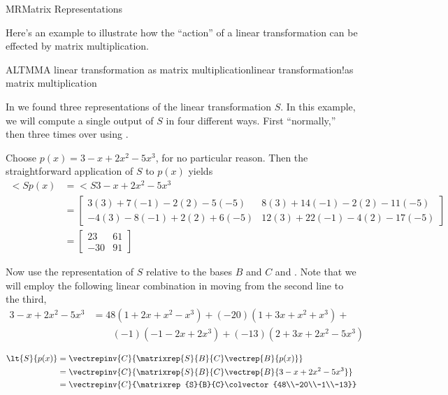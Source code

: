 \begin{subsect}{MR}{Matrix Representations}
\begin{para}
%
\end{para}
%
\begin{para}Here's an example to illustrate how the ``action'' of a linear transformation can be effected by matrix multiplication.\end{para}
%
\begin{example}{ALTMM}{A linear transformation as matrix multiplication}{linear transformation!as matrix multiplication}
\begin{para}In  we found three representations of the linear transformation $S$.  In this example, we will compute a single output of $S$ in four different ways.  First ``normally,'' then three times over using .\end{para}
%
\begin{para}Choose $p(x)=3-x+2x^2-5x^3$, for no particular reason.  Then the straightforward application of $S$ to $p(x)$ yields
%
\begin{align*}
\lt{S}{p(x)}
&=\lt{S}{3-x+2x^2-5x^3}\\
&=
\begin{bmatrix}
3(3)+7(-1)-2(2)-5(-5) & 8(3)+14(-1)-2(2)-11(-5)\\
-4(3)-8(-1)+2(2)+6(-5) & 12(3)+22(-1)-4(2)-17(-5)
\end{bmatrix}\\
&=
\begin{bmatrix}
23 & 61 \\ -30 & 91
\end{bmatrix}
%
\end{align*}
\end{para}
%
\begin{para}Now use the representation of $S$ relative to the bases $B$ and $C$ and .  Note that we will employ the following linear combination in moving from the second line to the third,
%
\begin{align*}
3-x+2x^2-5x^3
&= 48(1+2x+x^2-x^3)+(-20)(1+3x+x^2+x^3)+\\
&\quad\quad (-1)(-1-2x+2x^3)+(-13)(2+3x+2x^2-5x^3)
\end{align*}
\end{para}
%
\begin{para}\begin{align*}
\lt{S}{p(x)}
&=\vectrepinv{C}{\matrixrep{S}{B}{C}\vectrep{B}{p(x)}}\\
%
&=\vectrepinv{C}{\matrixrep{S}{B}{C}\vectrep{B}{3-x+2x^2-5x^3}}\\
%
&=\vectrepinv{C}{\matrixrep{S}{B}{C}\colvector{48\\-20\\-1\\-13}}\\

\end{align*}
\end{para}
\end{example}
\end{subsect}
